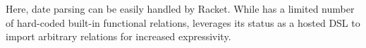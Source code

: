 \documentclass[dvipsnames,sigplan,screen,acmthm,nonacm]{acmart}
\begin{document}
Here, date parsing can be easily handled by Racket.
While \Dusa{} has a limited number of hard-coded built-in functional relations,
\miniDusa{} leverages its status as a hosted DSL to import arbitrary
relations for increased expressivity.


\clearpage


\end{document}
